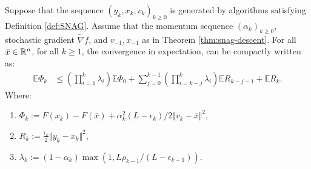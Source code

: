 \documentclass[12pt]{article}
\newcommand{\expect}{\ensuremath{\mathbb E}}
\begin{document}
        \begin{theorem}\label{thm:snag-generic-cnvg}
            Suppose that the sequence $(y_k, x_k, v_k)_{k \ge 0}$ is generated by algorithms satisfying Definition \ref{def:SNAG}. 
            Assume that the momentum sequence $(\alpha_k)_{k \ge 0}$, stochastic gradient $\tilde \nabla f$, and $v_{-1}, x_{-1}$ as in Theorem \ref{thm:snag-descent}. 
            For all $\bar x \in \mathbb R^n$, for all $k \ge 1$, the convergence in expectation, can be compactly written as: 
            \begin{align*}
                \expect \Phi_k &\le
                \left(
                    \prod_{i = 1}^k \lambda_i
                \right)\expect \Phi_0 + 
                \sum_{j = 0}^{k - 1}\left(
                    \prod_{i = k - j}^k \lambda_i
                \right)\expect R_{k - j - 1}
                + \expect R_k.
            \end{align*}
            Where: 
            \begin{enumerate}[nosep]
                \item $\Phi_k := F(x_k) - F(\bar x) + \alpha_k^2(L - \epsilon_k)/2 \Vert v_k - \bar x\Vert^2$, 
                \item $R_k := \frac{\epsilon_k}{2}\Vert y_k - x_k\Vert^2$, 
                \item $\lambda_k := (1 - \alpha_k)\max(1, L\rho_{k - 1}/(L - \epsilon_{k - 1}))$. 
            \end{enumerate}
        \end{theorem}
\end{document}
